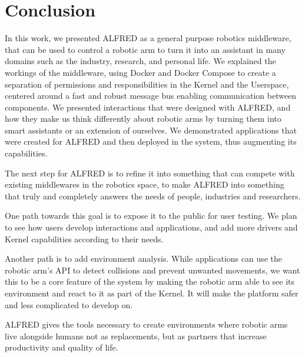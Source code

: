 \chapter{Conclusion}

In this work, we presented ALFRED as a general purpose robotics middleware, that can be used to control a robotic arm to turn it into an assistant in many domains such as the industry, research, and personal life. We explained the workings of the middleware, using Docker and Docker Compose to create a separation of permissions and responsibilities in the Kernel and the Userspace, centered around a fast and robust message bus enabling communication between components. We presented interactions that were designed with ALFRED, and how they make us think differently about robotic arms by turning them into smart assistants or an extension of ourselves. We demonstrated applications that were created for ALFRED and then deployed in the system, thus augmenting its capabilities.

The next step for ALFRED is to refine it into something that can compete with existing middlewares in the robotics space, to make ALFRED into something that truly and completely answers the needs of people, industries and researchers.

One path towards this goal is to expose it to the public for user testing. We plan to see how users develop interactions and applications, and add more drivers and Kernel capabilities according to their needs.

Another path is to add environment analysis. While applications can use the robotic arm's API to detect collisions and prevent unwanted movements, we want this to be a core feature of the system by making the robotic arm able to see its environment and react to it as part of the Kernel. It will make the platform safer and less complicated to develop on.

ALFRED gives the tools necessary to create environments where robotic arms live alongside humans not as replacements, but as partners that increase productivity and quality of life.

